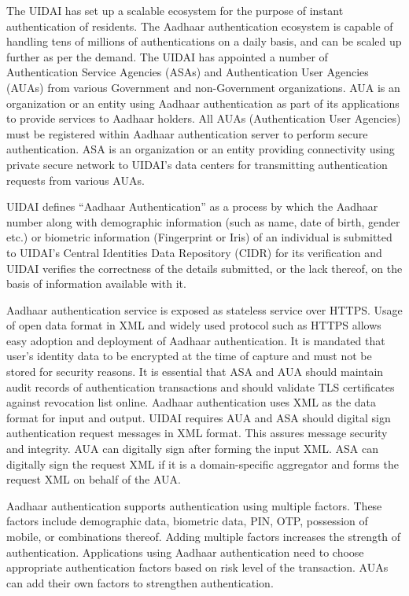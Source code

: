 \begin{multicols}{2}
The UIDAI has set up a scalable ecosystem for the purpose of instant authentication of residents. The Aadhaar authentication ecosystem is capable of handling tens of millions of authentications on a daily basis, and can be scaled up further as per the demand. The UIDAI has appointed a number of Authentication Service Agencies (ASAs) and Authentication User Agencies (AUAs) from various Government and non-Government organizations. AUA is an organization or an entity using Aadhaar authentication as part of its applications to provide services to Aadhaar holders. All AUAs (Authentication User Agencies) must be registered within Aadhaar authentication server to perform secure authentication.  ASA is an organization or an entity providing connectivity using private secure network to UIDAI's data centers for transmitting authentication requests from various AUAs.
 
UIDAI defines ``Aadhaar Authentication'' as a process by which the Aadhaar number along with demographic information (such as name, date of birth, gender etc.) or biometric information (Fingerprint or Iris) of an individual is submitted to UIDAI's Central Identities Data Repository (CIDR) for its verification and UIDAI verifies the correctness of the details submitted, or the lack thereof, on the basis of information available with it.
 
Aadhaar authentication service is exposed as stateless service over HTTPS. Usage of open data format in XML and widely used protocol such as HTTPS allows easy adoption and deployment of Aadhaar authentication. It is mandated that user's identity data to be encrypted at the time of capture and must not be stored for security reasons. It is essential that ASA and AUA should maintain audit records of authentication transactions and should validate TLS certificates against revocation list online. Aadhaar authentication uses XML as the data format for input and output. UIDAI requires AUA and ASA should digital sign authentication request messages in XML format. This assures message security and integrity. AUA can digitally sign after forming the input XML. ASA can digitally sign the request XML if it is a domain-specific aggregator and forms the request XML on behalf of the AUA.


Aadhaar authentication supports authentication using multiple factors. These factors include demographic data, biometric data, PIN, OTP, possession of mobile, or combinations thereof. Adding multiple factors increases the strength of authentication. Applications using Aadhaar authentication need to choose appropriate authentication factors based on risk level of the transaction. AUAs can add their own factors to strengthen authentication.
 

\end{multicols}

